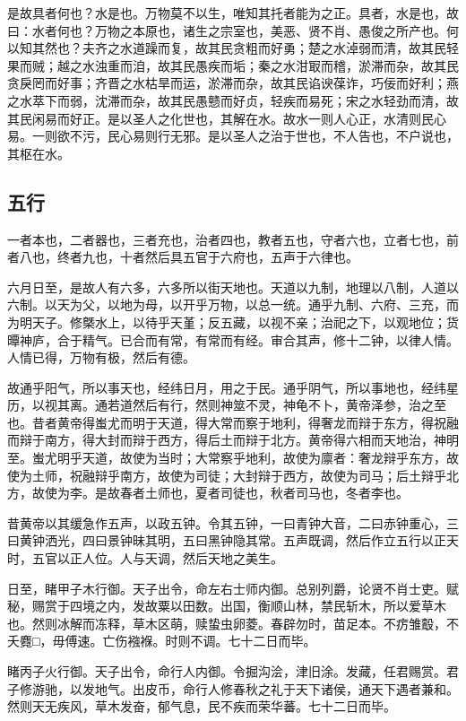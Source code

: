 \documentclass[]{article}
\begin{document}
是故具者何也？水是也。万物莫不以生，唯知其托者能为之正。具者，水是也，故曰：水者何也？万物之本原也，诸生之宗室也，美恶、贤不肖、愚俊之所产也。何以知其然也？夫齐之水道躁而复，故其民贪粗而好勇；楚之水淖弱而清，故其民轻果而贼；越之水浊重而洎，故其民愚疾而垢；秦之水泔冣而稽，淤滞而杂，故其民贪戾罔而好事；齐晋之水枯旱而运，淤滞而杂，故其民谄谀葆诈，巧佞而好利；燕之水萃下而弱，沈滞而杂，故其民愚戆而好贞，轻疾而易死；宋之水轻劲而清，故其民闲易而好正。是以圣人之化世也，其解在水。故水一则人心正，水清则民心易。一则欲不污，民心易则行无邪。是以圣人之治于世也，不人告也，不户说也，其枢在水。

\hypertarget{header-n559}{%
\subsection{五行}\label{header-n559}}

一者本也，二者器也，三者充也，治者四也，教者五也，守者六也，立者七也，前者八也，终者九也，十者然后具五官于六府也，五声于六律也。

六月日至，是故人有六多，六多所以街天地也。天道以九制，地理以八制，人道以六制。以天为父，以地为母，以开乎万物，以总一统。通乎九制、六府、三充，而为明天子。修槩水上，以待乎天堇；反五藏，以视不亲；治祀之下，以观地位；货曋神庐，合于精气。已合而有常，有常而有经。审合其声，修十二钟，以律人情。人情已得，万物有极，然后有德。

故通乎阳气，所以事天也，经纬日月，用之于民。通乎阴气，所以事地也，经纬星历，以视其离。通若道然后有行，然则神筮不灵，神龟不卜，黄帝泽参，治之至也。昔者黄帝得蚩尤而明于天道，得大常而察于地利，得奢龙而辩于东方，得祝融而辩于南方，得大封而辩于西方，得后土而辩于北方。黄帝得六相而天地治，神明至。蚩尤明乎天道，故使为当时；大常察乎地利，故使为廪者：奢龙辩乎东方，故使为土师，祝融辩乎南方，故使为司徒；大封辩于西方，故使为司马；后土辩乎北方，故使为李。是故春者土师也，夏者司徒也，秋者司马也，冬者李也。

昔黄帝以其缓急作五声，以政五钟。令其五钟，一曰青钟大音，二曰赤钟重心，三曰黄钟洒光，四曰景钟昧其明，五曰黑钟隐其常。五声既调，然后作立五行以正天时，五官以正人位。人与天调，然后天地之美生。

日至，睹甲子木行御。天子出令，命左右士师内御。总别列爵，论贤不肖士吏。赋秘，赐赏于四境之内，发故粟以田数。出国，衡顺山林，禁民斩木，所以爱草木也。然则冰解而冻释，草木区萌，赎蛰虫卵菱。春辟勿时，苗足本。不疠雏鷇，不夭麑□，毋傅速。亡伤襁褓。时则不调。七十二日而毕。

睹丙子火行御。天子出令，命行人内御。令掘沟浍，津旧涂。发藏，任君赐赏。君子修游驰，以发地气。出皮币，命行人修春秋之礼于天下诸侯，通天下遇者兼和。然则天无疾风，草木发奋，郁气息，民不疾而荣华蕃。七十二日而毕。
\end{document}

